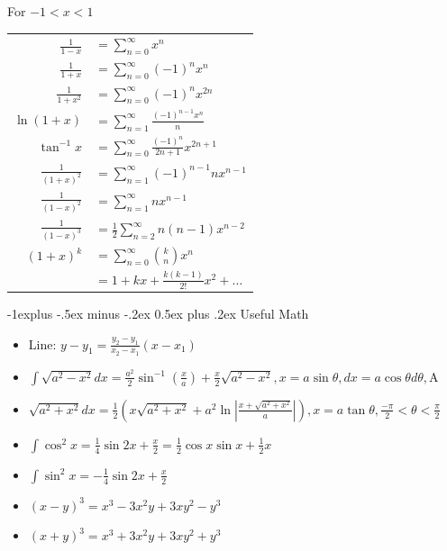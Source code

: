 \documentclass[10pt,landscape]{article}
\makeatletter
\renewcommand{\subsection}{\@startsection{subsection}{2}{0mm}%
  {-1explus -.5ex minus -.2ex}%
  {0.5ex plus .2ex}%
  {\normalfont\normalsize\bfseries}}
\makeatother
\begin{document}
\begin{multicols*}{4}
For $-1 < x < 1$
\\ \;  %
\setlength\tabcolsep{1.5pt} %
\begin{tabular}{rl}
           $\frac{1}{1 - x}$ & $= \sum\limits^\infty_{n = 0} x^n $
        \\ $\frac{1}{1 + x}$ & $= \sum\limits^\infty_{n = 0} (-1)^nx^n $
        \\ $\frac{1}{1 + x^2}$ & $= \sum\limits^\infty_{n = 0} (-1)^nx^{2n} $
        \\ $\ln(1 + x)$ & $= \sum\limits^\infty_{n = 1} \frac{(-1)^{n - 1}x^n}{n} $
        \\ $\tan^{-1}x$ & $= \sum\limits^\infty_{n = 0} \frac{(-1)^n}{2n + 1} x^{2n+1}$
        \\ $\frac{1}{(1+x)^2}$ & $= \sum\limits^\infty_{n = 1} (-1)^{n-1}nx^{n-1}$
        \\ $\frac{1}{(1-x)^2}$ & $= \sum\limits^\infty_{n = 1} nx^{n-1}$
        \\ $\frac{1}{(1-x)^3}$ & $= \frac{1}{2} \sum\limits^\infty_{n = 2} n(n - 1)x^{n-2}$
        \\ $(1 + x)^k$ & $= \sum\limits^\infty_{n = 0} \binom{k}{n}x^n$
        \\   & $= 1 + kx + \frac{k(k-1)}{2!}x^2 + \dots$
\end{tabular}

\subsection{Useful Math}

\begin{itemize}
  \item Line: $y-y_{1} = \frac{y_{2}-y_{1}}{x_{2}-x_{1}}(x-x_{1})$
  \item $\int \sqrt{a^{2}-x^{2}}dx = \frac{a^{2}}{2}\sin^{-1}(\frac{x}{a}) + \frac{x}{2}\sqrt{a^{2}-x^{2}}, x = a\sin\theta, dx = a\cos\theta d\theta, $A
  \item $\sqrt{a^{2}+x^{2}}dx = \frac{1}{2}\left(x\sqrt{a^{2}+x^{2}} + a^{2}\ln\left|\frac{x+\sqrt{a^{2}+x^{2}}}{a}\right|\right), x = a\tan\theta, \frac{-\pi}{2} < \theta < \frac{\pi}{2}$
  \item $\int\cos^{2}x = \frac{1}{4} \sin2x + \frac{x}{2} = \frac{1}{2}\cos x \sin x + \frac{1}{2}x$
  \item $\int\sin^{2}x = -\frac{1}{4} \sin2x + \frac{x}{2}$
  \item $(x-y)^{3} = x^{3} - 3x^{2}y + 3xy^{2}-y^{3}$
  \item $(x+y)^{3} = x^{3} + 3x^{2}y + 3xy^{2}+y^{3}$

\end{itemize}

\end{multicols*}
\end{document}
